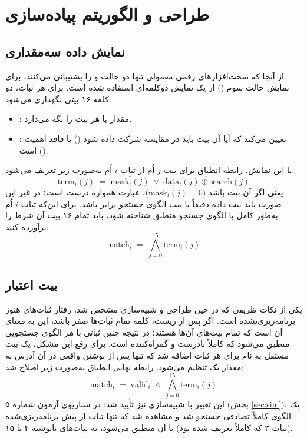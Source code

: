 \documentclass[11pt,a4paper]{article}
\begin{document}
\section{طراحی و الگوریتم پیاده‌سازی}

\subsection{نمایش داده سه‌مقداری}
از آنجا که سخت‌افزارهای رقمی معمولی تنها دو حالت  و  را
پشتیبانی می‌کنند، برای نمایش حالت سوم () از یک نمایش دوکلمه‌ای استفاده
شده است. برای هر ثبات، دو کلمه ۱۶ بیتی نگهداری می‌شود:
\begin{itemize}
    \item {}: مقدار  یا  هر بیت را نگه می‌دارد.
    \item {}: تعیین می‌کند که آیا آن بیت باید در مقایسه
          شرکت داده شود () یا فاقد اهمیت است ().
\end{itemize}
با این نمایش، رابطه انطباق برای بیت $j$ اُم از ثبات $i$ اُم به‌صورت زیر
تعریف می‌شود:
\[
    \mathrm{term}_i(j) \;=\; \overline{\mathrm{mask}_i(j)} \;\lor\; \overline{\mathrm{data}_i(j) \oplus \mathrm{search}(j)}
\]
یعنی اگر آن بیت  باشد ($\mathrm{mask}_i(j)=0$)، عبارت همواره
درست است؛ در غیر این صورت باید بیت داده دقیقاً با بیت الگوی جستجو برابر
باشد. برای این‌که ثبات $i$ اُم به‌طور کامل با الگوی جستجو منطبق شناخته
شود، باید تمام ۱۶ بیت آن شرط را برآورده کنند:
\[
    \mathrm{match}_i \;=\; \bigwedge_{j=0}^{15} \mathrm{term}_i(j)
\]

\subsection{بیت اعتبار }
یکی از نکات ظریفی که در حین طراحی و شبیه‌سازی مشخص شد، رفتار ثبات‌های
هنوز برنامه‌ریزی‌نشده است. اگر پس از ریست، کلمه  تمام
ثبات‌ها صفر باشد، این به معنای آن است که تمام بیت‌های آن‌ها 
هستند؛ در نتیجه چنین ثباتی با \emph{هر} الگوی جستجویی منطبق می‌شود که
کاملاً نادرست و گمراه‌کننده است. برای رفع این مشکل، یک بیت مستقل به نام
 برای هر ثبات اضافه شد که تنها پس از نوشتن واقعی در آن
آدرس به مقدار یک تنظیم می‌شود. رابطه نهایی انطباق به‌صورت زیر اصلاح شد:
\[
    \mathrm{match}_i \;=\; \mathrm{valid}_i \;\land\; \bigwedge_{j=0}^{15} \mathrm{term}_i(j)
\]
این تغییر با شبیه‌سازی نیز تأیید شد: در سناریوی آزمون شماره ۵ (بخش
\ref{sec:sim})، یک الگوی کاملاً تصادفی جستجو شد و مشاهده شد که تنها ثبات
از پیش برنامه‌ریزی‌شده (ثبات ۳ که کاملاً  تعریف شده بود) با آن منطبق
می‌شود، نه ثبات‌های نانوشته ۴ تا ۱۵.
\end{document}
